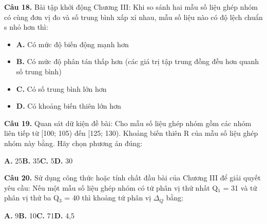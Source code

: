 \documentclass[11pt,a4paper]{article}
\begin{document}
\textbf{\color{primary} Câu 18.} Bài tập khởi động Chương III: Khi so sánh hai mẫu số liệu ghép nhóm có cùng đơn vị đo và số trung bình xấp xỉ nhau, mẫu số liệu nào có độ lệch chuẩn s nhỏ hơn thì:\par
\begin{itemize}\setlength{\itemsep}{1pt}\setlength{\parskip}{0pt}
  \item[] \textbf{A.} Có mức độ biến động mạnh hơn
  \item[] \textbf{B.} Có mức độ phân tán thấp hơn (các giá trị tập trung đồng đều hơn quanh số trung bình)
  \item[] \textbf{C.} Có số trung bình lớn hơn
  \item[] \textbf{D.} Có khoảng biến thiên lớn hơn
\end{itemize}\vspace{2pt}
\textbf{\color{primary} Câu 19.} Quan sát dữ kiện đề bài: Cho mẫu số liệu ghép nhóm gồm các nhóm liên tiếp từ [100; 105) đến [125; 130). Khoảng biến thiên R của mẫu số liệu ghép nhóm này bằng. Hãy chọn phương án đúng:\par
\hspace*{1.5em}\textbf{A.} 25\quad\quad \textbf{B.} 35\quad\quad \textbf{C.} 5\quad\quad \textbf{D.} 30\par\vspace{2pt}
\textbf{\color{primary} Câu 20.} Sử dụng công thức hoặc tính chất đầu bài của Chương III để giải quyết yêu cầu: Nếu một mẫu số liệu ghép nhóm có tứ phân vị thứ nhất Q$_1$ = 31 và tứ phân vị thứ ba Q$_3$ = 40 thì khoảng tứ phân vị $\Delta_Q$ bằng:\par
\hspace*{1.5em}\textbf{A.} 9\quad\quad \textbf{B.} 10\quad\quad \textbf{C.} 71\quad\quad \textbf{D.} 4,5\par\vspace{2pt}
\end{document}
